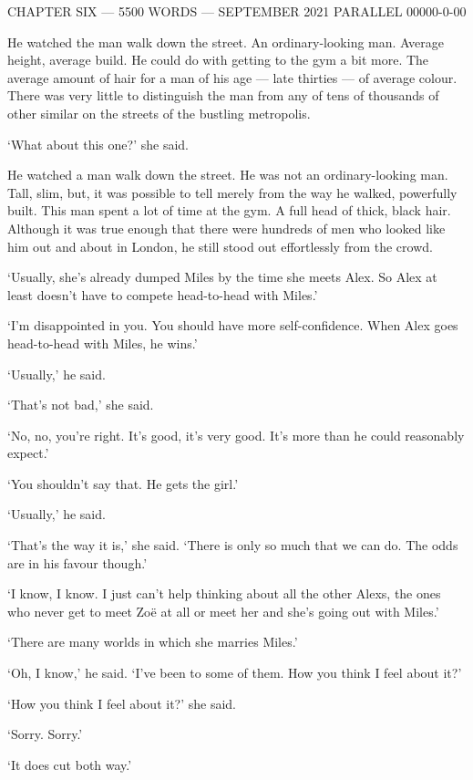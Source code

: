 {\parindent=0pt {\obeylines
{\twelvess CHAPTER SIX --- 5500 WORDS --- SEPTEMBER 2021}
{\twelvess PARALLEL 00000-0-00}}
\vskip 1cm

\twelverm
He watched the man walk down the street. An ordinary-looking man.
Average height, average build. He could do with getting to the gym a
bit more. The average amount of hair for a man of his age --- late
thirties --- of average colour. There was very little to distinguish
the man from any of tens of thousands of other similar on the
streets of the bustling metropolis.}

`What about this one?' she said.

He watched a man walk down the street. He was not an
ordinary-looking man. Tall, slim, but, it was possible to tell
merely from the way he walked, powerfully built. This man spent a lot of
time at the gym. A full head of thick, black hair. Although it was
true enough that there were hundreds of men who looked like him out
and about in London, he still stood out effortlessly from the crowd.

`Usually, she's already dumped Miles by the time she meets Alex. So Alex at least doesn't have to compete head-to-head with
Miles.'

`I'm disappointed in you. You should have more
self-confidence. When Alex goes head-to-head with Miles, he wins.'

`Usually,' he said.

`That's not bad,' she said.

`No, no, you're right. It's good, it's very good. It's more than he
could reasonably expect.'

`You shouldn't say that. He gets the girl.'

`{\twelveit Usually\/},' he said.

`That's the way it is,' she said. `There is only so much that we can do. The odds are in his
favour though.'

`I know, I know. I just can't help thinking about all the other Alexs,
the ones who never get to meet Zo{\"e} at all or meet her and she's going
out with Miles.'

`There are many worlds in which she marries Miles.'

`Oh, I know,' he said. `I've been to some of them. How you think I feel about it?'

`How you think {\twelveit I\/} feel about it?' she said.

`Sorry. Sorry.'

`It does cut both way.'

